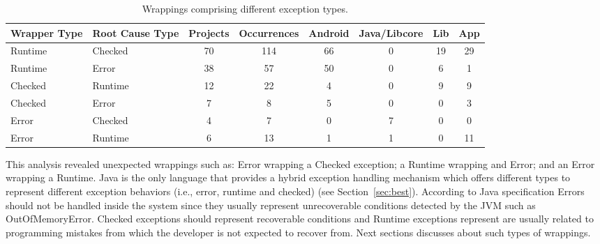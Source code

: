 \documentclass[conference]{IEEEtran}
\begin{document}

\begin{table}
  \centering
  \begin{tabular}{llcccccc}
    \hline
    \bfseries{Wrapper Type}  &  \bfseries{Root Cause Type} &  \bfseries{Projects}  &  \bfseries{Occurrences} & \textsf{Android} & \textsf{Java/Libcore} & \textsf{Lib} & \textsf{App}  \\
    \hline
      Runtime &  Checked   & 70 & 114 & 66 &  0  & 19 &  29 \\
      Runtime   &  Error   & 38  & 57 & 50 &  0  & 6 &  1 \\
      Checked &  Runtime   & 12 & 22 & 4 &  0  & 9 &  9 \\
      Checked & Error      & 7 &  8 & 5 &  0  & 0 &  3 \\
      Error & Checked      & 4  &  7 & 0 &  7  & 0 &  0     \\
      Error & Runtime     & 6  &  13   & 1 &  1  & 0 &  11    \\
    \hline
  \end{tabular}
\caption{Wrappings comprising different exception types.}
\label{tab:wrappingandroid}
\end{table}

This analysis revealed unexpected wrappings such as: Error wrapping a Checked 
exception; a Runtime wrapping and Error; and an Error wrapping a Runtime.
Java is the only language that provides a hybrid exception handling mechanism
which offers  different types to represent different exception behaviors (i.e., error, 
runtime and checked) (see Section~\ref{sec:best}). According to Java specification Errors should not be
handled inside the system since they usually represent unrecoverable conditions
detected by the JVM such as OutOfMemoryError. Checked exceptions should
represent recoverable conditions and  Runtime exceptions represent are usually
related to programming mistakes from which the developer is not expected to recover
from. Next sections discusses about such types of wrappings.
\end{document}
